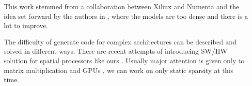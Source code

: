 \documentclass[sigconf]{acmart}
\begin{document}
This work stemmed from a collaboration between Xilinx and Numenta and
the idea set forward by the authors in \cite{ahmad2019dense}, where
the models are too dense and there is a lot to improve.


The difficulty of generate code for complex architectures can be
described and solved in different ways. There are recent attempts of
introducing SW/HW solution for spatial processors like ours
\cite{Huang2021CoSASB,Russo2023MemoryAwareDA,Cai2023InterlayerSS}.
Usually major attention is given only to matrix multiplication and
GPUs \cite{Gray2017GPUKF} \cite{li2023popsparse}, we can work on only static
sparsity at this time.










\end{document}
